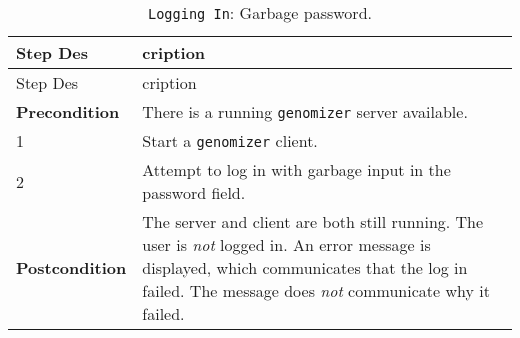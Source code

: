 \begin{longtable}[c]{@{}ll@{}}
\caption{\texttt{Logging\ In}: Garbage password.}\tabularnewline
\toprule
\begin{minipage}[b]{0.31\columnwidth}\raggedright\strut
Step Des
\strut\end{minipage} &
\begin{minipage}[b]{0.63\columnwidth}\raggedright\strut
cription
\strut\end{minipage}\tabularnewline
\midrule
\endfirsthead
\toprule
\begin{minipage}[b]{0.31\columnwidth}\raggedright\strut
Step Des
\strut\end{minipage} &
\begin{minipage}[b]{0.63\columnwidth}\raggedright\strut
cription
\strut\end{minipage}\tabularnewline
\midrule
\endhead
\begin{minipage}[t]{0.31\columnwidth}\raggedright\strut
\textbf{Precondition}
\strut\end{minipage} &
\begin{minipage}[t]{0.63\columnwidth}\raggedright\strut
There is a running \texttt{genomizer} server available.
\strut\end{minipage}\tabularnewline
\begin{minipage}[t]{0.31\columnwidth}\raggedright\strut
1
\strut\end{minipage} &
\begin{minipage}[t]{0.63\columnwidth}\raggedright\strut
Start a \texttt{genomizer} client.
\strut\end{minipage}\tabularnewline
\begin{minipage}[t]{0.31\columnwidth}\raggedright\strut
2
\strut\end{minipage} &
\begin{minipage}[t]{0.63\columnwidth}\raggedright\strut
Attempt to log in with garbage input in the password field.
\strut\end{minipage}\tabularnewline
\begin{minipage}[t]{0.31\columnwidth}\raggedright\strut
\textbf{Postcondition}
\strut\end{minipage} &
\begin{minipage}[t]{0.63\columnwidth}\raggedright\strut
The server and client are both still running. The user is \emph{not}
logged in. An error message is displayed, which communicates that the
log in failed. The message does \emph{not} communicate why it failed.
\strut\end{minipage}\tabularnewline
\bottomrule
\end{longtable}

